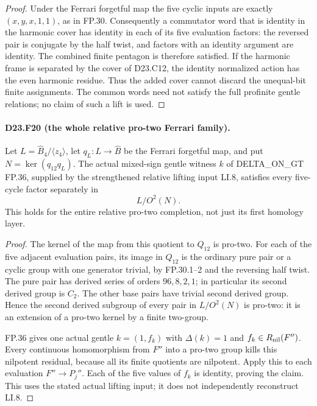 \begin{proof}
Under the Ferrari forgetful map the
five cyclic inputs are exactly
$(x,y,x,1,1)$, as in FP.30. Consequently
a commutator word that is identity in
the harmonic cover has identity in
each of its five evaluation factors:
the reversed pair is conjugate by
the half twist, and factors with an
identity argument are identity.
The combined finite pentagon is
therefore satisfied. If the harmonic
frame is separated by the cover of
D23.C12, the identity normalized
action has the even harmonic residue.
Thus the added cover cannot discard
the unequal-bit finite assignments.
The common words need not satisfy
the full profinite gentle relations;
no claim of such a lift is used.
\end{proof}

\paragraph{D23.F20 (the whole relative pro-two Ferrari family).}
Let $L=\widehat B_4/\langle z_4\rangle$, let
$q_L:L\to\widehat B$ be the Ferrari forgetful map,
and put $N=\ker(q_{12}q_L)$.
The actual mixed-sign gentle witness $k$ of
DELTA\_ON\_GT FP.36, supplied by the strengthened
relative lifting input LI.8, satisfies every
five-cycle factor separately in
\[
 L/O^2(N).
\]
This holds for the entire relative pro-two
completion, not just its first homology layer.

\begin{proof}
The kernel of the map from this quotient
to $Q_{12}$ is pro-two. For each of
the five adjacent evaluation pairs,
its image in $Q_{12}$ is the ordinary
pure pair or a cyclic group with
one generator trivial, by FP.30.1--2
and the reversing half twist.
The pure pair has derived series
of orders $96,8,2,1$; in particular
its second derived group is $C_2$.
The other base pairs have trivial
second derived group. Hence the
second derived subgroup of every
pair in $L/O^2(N)$ is pro-two:
it is an extension of a pro-two
kernel by a finite two-group.

FP.36 gives one actual gentle
$k=(1,f_k)$ with $\Delta(k)=1$
and $f_k\in R_{\rm nil}(F'')$.
Every continuous homomorphism
from $F''$ into a pro-two group
kills this nilpotent residual,
because all its finite quotients
are nilpotent. Apply this to
each evaluation $F''\to P_j''$.
Each of the five values of $f_k$
is identity, proving the claim.
This uses the stated actual
lifting input; it does not
independently reconstruct LI.8.
\end{proof}
